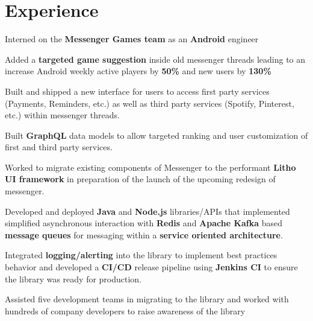 \documentclass[letterpaper]{deedy-resume} %
\begin{document}
\begin{minipage}[t]{0.66\textwidth} %


\section{Experience}


\vspace{\topsep} %
\begin{tightitemize}
\item Interned on the {\bf Messenger Games team} as an {\bf Android} engineer
\item Added a {\bf targeted game suggestion} inside old messenger threads leading to an increase Android weekly active players by {\bf 50\%} and new users by {\bf 130\%}
\item Built and shipped a new interface for users to access first party services (Payments, Reminders, etc.) as well as third party services (Spotify, Pinterest, etc.) within messenger threads.
\item Built {\bf GraphQL} data models to allow targeted ranking and user customization of first and third party services.
\item Worked to migrate existing components of Messenger to the performant {\bf Litho UI framework} in preparation of the launch of the upcoming redesign of messenger.
\end{tightitemize}

\sectionspace %



\begin{tightitemize}
\item Developed and deployed {\bf Java}  and {\bf Node.js} libraries/APIs that implemented simplified asynchronous interaction with {\bf Redis} and {\bf Apache Kafka} based {\bf message queues} for messaging within a {\bf service oriented architecture}.
\item Integrated {\bf logging/alerting} into the library to implement best practices behavior and developed a {\bf CI/CD} release pipeline using {\bf Jenkins CI} to ensure the library was ready for production.
\item Assisted five development teams in migrating to the library and worked with hundreds of company developers to raise awareness of the library
\end{tightitemize}


\end{minipage}
\end{document}
